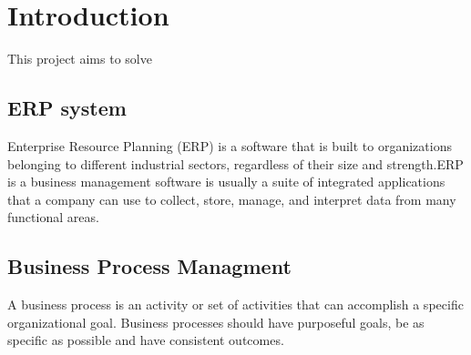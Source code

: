\section{Introduction}
        This project aims to solve

        \subsection{ERP system}
        Enterprise Resource Planning (ERP) is a software that is built to organizations belonging to different industrial sectors, regardless of their size and strength.ERP is a business management software is usually a suite of integrated applications that a company can use to collect, store, manage, and interpret data from many functional areas.

        \subsection{Business Process Managment}
        A business process is an activity or set of activities that can accomplish a specific organizational goal. Business processes should have purposeful goals, be as specific as possible and have consistent outcomes.

